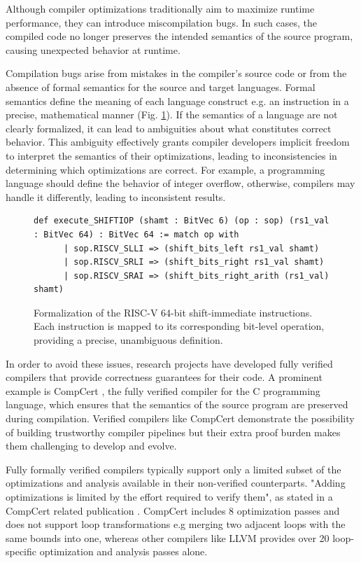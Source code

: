 Although compiler optimizations traditionally aim to maximize runtime performance, they can introduce miscompilation bugs. In such cases, the compiled code no longer preserves the intended semantics of the source program, causing unexpected behavior at runtime.

Compilation bugs arise from mistakes in the compiler’s source code or from the absence of formal semantics for the source and target languages. Formal semantics define the meaning of each language construct e.g. an instruction in a precise, mathematical manner (Fig. \ref{fig:intro_semantics}). If the semantics of a language are not clearly formalized, it can lead to ambiguities about what constitutes correct behavior. This ambiguity effectively grants compiler developers implicit freedom to interpret the semantics of their optimizations, leading to inconsistencies in determining which optimizations are correct. For example, a programming language should define the behavior of integer overflow, otherwise, compilers may handle it differently, leading to inconsistent results.

\begin{figure}
\begin{minipage}{\textwidth}
\begin{lstlisting}
def execute_SHIFTIOP (shamt : BitVec 6) (op : sop) (rs1_val : BitVec 64) : BitVec 64 := match op with
      | sop.RISCV_SLLI => (shift_bits_left rs1_val shamt)
      | sop.RISCV_SRLI => (shift_bits_right rs1_val shamt)
      | sop.RISCV_SRAI => (shift_bits_right_arith (rs1_val) shamt)
\end{lstlisting}
\end{minipage}
\caption{
Formalization of the RISC-V 64-bit shift-immediate instructions. Each instruction is mapped to its corresponding bit-level operation, providing a precise, unambiguous definition.}
\label{fig:intro_semantics}
\end{figure}

In order to avoid these issues, research projects have developed fully verified compilers that provide correctness guarantees for their code. A prominent example is CompCert \cite{CompCertPaper}, the fully verified compiler for the C programming language, which ensures that the semantics of the source program are preserved during compilation. Verified compilers like CompCert demonstrate the possibility of building trustworthy compiler pipelines but their extra proof burden makes them challenging to develop and evolve. 

Fully formally verified compilers typically support only a limited subset of the optimizations and analysis available in their non-verified counterparts. "Adding optimizations is limited by the effort required to verify them", as stated in a CompCert related publication \cite{Mullen2016}. CompCert includes 8 optimization passes and does not support loop transformations e.g merging two adjacent loops with the same bounds into one, whereas other compilers like LLVM provides over 20 loop-specific optimization and analysis passes alone.\cite{compcert_web} 

